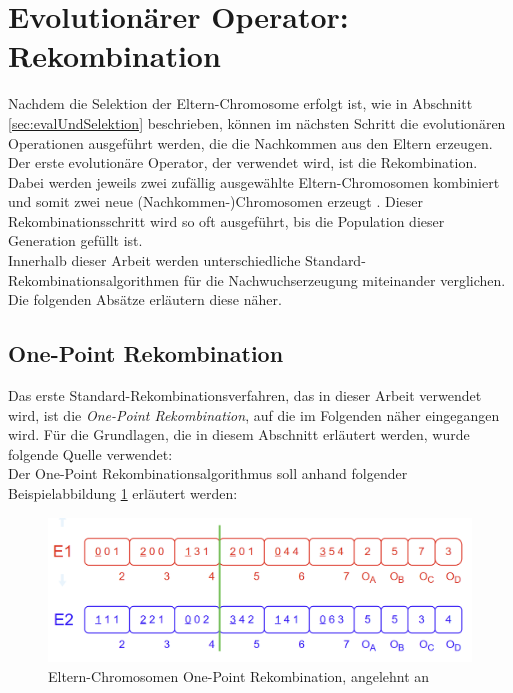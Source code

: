 \section{Evolutionärer Operator: Rekombination}
\label{sec:evolutionäreOperatoren}
Nachdem die Selektion der Eltern-Chromosome erfolgt ist, wie in Abschnitt \ref{sec:evalUndSelektion} beschrieben, können im nächsten Schritt die evolutionären Operationen ausgeführt werden, die die Nachkommen aus den Eltern erzeugen. \\
Der erste evolutionäre Operator, der verwendet wird, ist die Rekombination.
Dabei werden jeweils zwei zufällig ausgewählte Eltern-Chromosomen kombiniert und somit zwei neue (Nachkommen-)Chromosomen erzeugt \cite{kalkreuth_comprehensive_2020}. Dieser Rekombinationsschritt wird so oft ausgeführt, bis die Population dieser Generation gefüllt ist.\\
Innerhalb dieser Arbeit werden unterschiedliche Standard-Rekombinationsalgorithmen für die Nachwuchserzeugung miteinander verglichen.
Die folgenden Absätze erläutern diese näher.

\subsection{One-Point Rekombination}
\label{subsubsec:onePointCrossover}
Das erste Standard-Rekombinationsverfahren, das in dieser Arbeit verwendet wird, ist die \emph{One-Point Rekombination}, auf die im Folgenden näher eingegangen wird.
Für die Grundlagen, die in diesem Abschnitt erläutert werden, wurde folgende Quelle verwendet: \cite{pavai_survey_2017}\\
Der One-Point Rekombinationsalgorithmus soll anhand folgender Beispielabbildung \ref{fig:onePointCrossoverEltern} erläutert werden:

\begin{figure}[H]
    \centering
    \includegraphics[scale = 0.45]{Bilder/BeispielOnePointCrossover.png}
    \caption{Eltern-Chromosomen One-Point Rekombination, angelehnt an \cite{torabi_using_2022}}
    \label{fig:onePointCrossoverEltern}
\end{figure}

